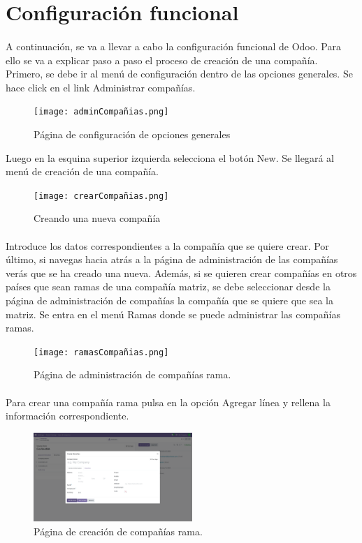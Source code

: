 \documentclass[paper=a4wide, fontsize=11pt]{report}	 %
\begin{document}
\section{Configuración funcional}
\paragraph{}
A continuación, se va a llevar a cabo la configuración funcional de Odoo. Para ello se va a explicar paso a paso el proceso de creación de una compañía. Primero, se debe ir al menú de configuración dentro de las opciones generales. Se hace click en el link Administrar compañías.
\newpage
\begin{figure}[h]
    \centering
    \texttt{[image: adminCompañias.png]}
    \caption{Página de configuración de opciones generales}
    \label{fig:faqs}
\end{figure}
Luego en la esquina superior izquierda selecciona el botón New. Se llegará al menú de creación de una compañía.
\begin{figure}[h]
    \centering
    \texttt{[image: crearCompañias.png]}
    \caption{Creando una nueva compañía}
    \label{fig:faqs}
\end{figure}
\paragraph{}
Introduce los datos correspondientes a la compañía que se quiere crear. Por último, si navegas hacia atrás a la página de administración de las compañías verás que se ha creado una nueva. Además, si se quieren crear compañías en otros países que sean ramas de una compañía matriz, se debe seleccionar desde la página de administración de compañías la compañía que se quiere que sea la matriz. Se entra en el menú Ramas donde se puede administrar las compañías ramas. 
\begin{figure}[h]
    \centering
    \texttt{[image: ramasCompañias.png]}
    \caption{Página de administración de compañías rama.}
    \label{fig:faqs}
\end{figure}
\paragraph{}
Para crear una compañía rama pulsa en la opción Agregar línea y rellena la información correspondiente. 
\newpage
\begin{figure}[h]
    \centering
    \includegraphics[width=6cm]{crearRama.png}
    \caption{Página de creación de compañías rama.}
    \label{fig:faqs}
\end{figure}
\end{document}
